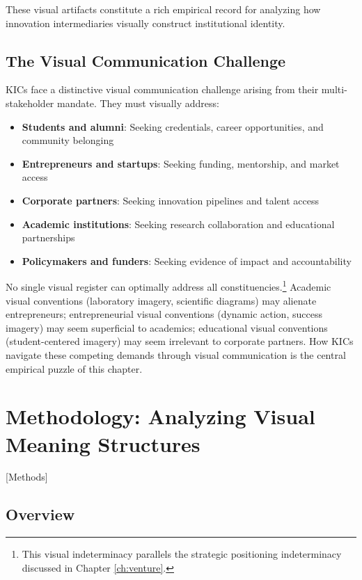 \documentclass[../main.tex]{subfiles}
\begin{document}
These visual artifacts constitute a rich empirical record for analyzing how innovation intermediaries visually construct institutional identity.

\subsection{The Visual Communication Challenge}

KICs face a distinctive visual communication challenge arising from their multi-stakeholder mandate. They must visually address:

\begin{itemize}
    \item \textbf{Students and alumni}: Seeking credentials, career opportunities, and community belonging
    \item \textbf{Entrepreneurs and startups}: Seeking funding, mentorship, and market access
    \item \textbf{Corporate partners}: Seeking innovation pipelines and talent access
    \item \textbf{Academic institutions}: Seeking research collaboration and educational partnerships
    \item \textbf{Policymakers and funders}: Seeking evidence of impact and accountability
\end{itemize}

No single visual register can optimally address all constituencies.\footnote{This visual indeterminacy parallels the strategic positioning indeterminacy discussed in Chapter \ref{ch:venture}.} Academic visual conventions (laboratory imagery, scientific diagrams) may alienate entrepreneurs; entrepreneurial visual conventions (dynamic action, success imagery) may seem superficial to academics; educational visual conventions (student-centered imagery) may seem irrelevant to corporate partners. How KICs navigate these competing demands through visual communication is the central empirical puzzle of this chapter.

\section{Methodology: Analyzing Visual Meaning Structures}[Methods]

\subsection{Overview}
\end{document}
